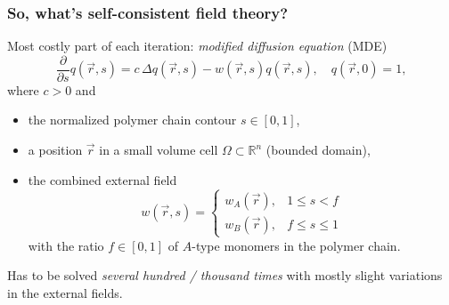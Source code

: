 \begin{frame}[t]
    \frametitle{So, what's self-consistent field theory?}

    Most costly part of each iteration: \emph{modified diffusion equation} (MDE)
        \begin{equation}
            \frac{\partial}{\partial s}q(\vec{r}, s) = c\,\Delta q(\vec{r}, s) - w(\vec{r}, s)q(\vec{r}, s), \quad q(\vec{r}, 0) = 1,
        \end{equation}
    where $c > 0$ and
    \begin{itemize}
        \item the normalized polymer chain contour $s \in [0, 1]$,
        \item a position $\vec{r}$ in a small volume cell $\Omega \subset \mathbb{R}^{n}$ (bounded domain),
        \item the combined external field
        \begin{equation}
            w(\vec{r}, s) = \begin{cases}
                w_{A}(\vec{r}), & 1 \leq s < f \\
                w_{B}(\vec{r}), & f \leq s \leq 1
            \end{cases}
        \end{equation}
        with the ratio $f \in [0, 1]$ of $A$-type monomers in the polymer chain.
    \end{itemize}

    Has to be solved \emph{several hundred / thousand times} with mostly slight variations in the external fields.
\end{frame}

